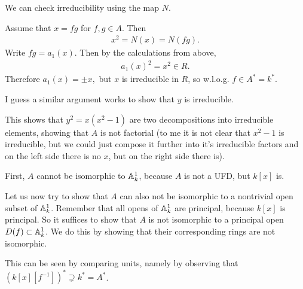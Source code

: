 \begin{exercise}{3}
\begin{enumerate}
        We can check irreducibility using the map $N.$

        Assume that $x=fg$ for $f,g\in A$. Then
        \begin{align*}
            x^2=N(x)=N(fg).
        \end{align*}
        Write $fg=a_1(x)$. Then by the calculations from above,
        \begin{align*}
            a_1(x)^2=x^2 \in R.
        \end{align*}
        Therefore $a_1(x)=\pm x,$ but $x$ is irreducible in $R$, so w.l.o.g. $f\in A^*=k^*$. 

        I guess a similar argument works to show that $y$ is irreducible.

        This shows that $y^2=x(x^2-1)$ are two decompositions into irreducible elements, showing that $A$ is not 
        factorial (to me it is not clear that $x^2-1$ is irreducible, but we could just compose it further 
        into it's irreducible factors and on the left side there is no $x$, but on the right side there is).

        First, $A$ cannot be isomorphic to $\mathbb{A}^1_k$, because $A$ is not a UFD, but $k[x]$ is.

        Let us now try to show that $A$ can also not be isomorphic to a nontrivial open subset of $\mathbb{A}^1_k$.
        Remember that all opens of $\mathbb{A}^1_k$ are principal, because $k[x]$ is principal. So it suffices to
        show that $A$ is not isomorphic to a principal open $D(f)\subset\mathbb{A}^1_k$. We do this by showing that
        their corresponding rings are not isomorphic. 
        
        This can be seen by comparing units, namely by observing that $(k[x][f^{-1}])^*\supsetneq k^*=A^*$.
    \end{enumerate}
\end{exercise}


